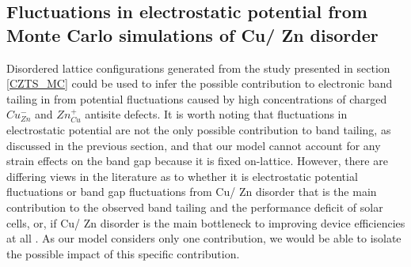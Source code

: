 \documentclass[11pt, twoside]{report}
\begin{document}




\subsection{Fluctuations in electrostatic potential from Monte Carlo simulations of Cu/ Zn disorder}

Disordered lattice configurations generated from the study presented in section \ref{CZTS_MC} \cite{eris_paper} could be used to infer the possible contribution to electronic band tailing in {\CZTS} from potential fluctuations caused by high concentrations of charged $Cu_{Zn}^{-}$ and $Zn_{Cu}^{+}$ antisite defects. 
It is worth noting that fluctuations in electrostatic potential are not the only possible contribution to band tailing, as discussed in the previous section, and that our model cannot account for any strain effects on the band gap because it is fixed on-lattice. However, there are differing views in the literature as to whether it is electrostatic potential fluctuations or band gap fluctuations from Cu/ Zn disorder that is the main contribution to the observed band tailing and the performance deficit of {\CZTS} solar cells, or, if Cu/ Zn disorder is the main bottleneck to improving device efficiencies at all \cite{culprit, kesterite_band_tails, band_tail}. As our model considers only one contribution, we would be able to isolate the possible impact of this specific contribution.
\end{document}
